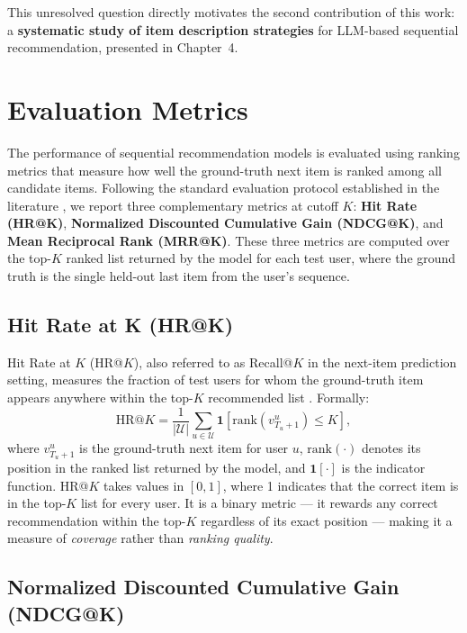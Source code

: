 \documentclass[12pt,a4paper]{report}
\newcommand{\parencite}[1]{\citep{#1}}
\begin{document}
This unresolved question directly motivates the second contribution
of this work: a \textbf{systematic study of item description
strategies} for LLM-based sequential recommendation, presented in
Chapter~4.

\section{Evaluation Metrics}

The performance of sequential recommendation models is evaluated
using ranking metrics that measure how well the ground-truth next
item is ranked among all candidate items. Following the standard
evaluation protocol established in the literature
\parencite{kang2018self}, we report three complementary metrics
at cutoff $K$: \textbf{Hit Rate (HR@K)}, \textbf{Normalized
Discounted Cumulative Gain (NDCG@K)}, and \textbf{Mean Reciprocal
Rank (MRR@K)}. These three metrics are computed over the top-$K$
ranked list returned by the model for each test user, where the
ground truth is the single held-out last item from the user's
sequence.

\subsection{Hit Rate at K (HR@K)}

Hit Rate at $K$ (HR@$K$), also referred to as Recall@$K$ in the
next-item prediction setting, measures the fraction of test users
for whom the ground-truth item appears anywhere within the top-$K$
recommended list \parencite{kang2018self}. Formally:
\begin{equation}
  \text{HR@}K = \frac{1}{|\mathcal{U}|}
    \sum_{u \in \mathcal{U}}
    \mathbf{1}\!\left[ \text{rank}(v_{T_u+1}^u) \leq K \right],
\end{equation}
where $v_{T_u+1}^u$ is the ground-truth next item for user $u$,
$\text{rank}(\cdot)$ denotes its position in the ranked list
returned by the model, and $\mathbf{1}[\cdot]$ is the indicator
function. HR@$K$ takes values in $[0, 1]$, where 1 indicates
that the correct item is in the top-$K$ list for every user.
It is a binary metric --- it rewards any correct recommendation
within the top-$K$ regardless of its exact position --- making
it a measure of \textit{coverage} rather than \textit{ranking
quality}.

\subsection{Normalized Discounted Cumulative Gain (NDCG@K)}
\end{document}
